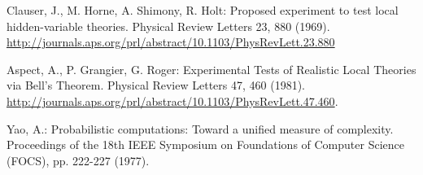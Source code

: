 Clauser, J., M. Horne, A. Shimony, R. Holt: Proposed experiment to test local
hidden-variable theories. Physical Review Letters 23, 880 (1969). \url{http://journals.aps.org/prl/abstract/10.1103/PhysRevLett.23.880}

Aspect, A., P. Grangier, G. Roger: Experimental Tests of Realistic Local Theories via Bell's Theorem. Physical Review Letters 47, 460 (1981). \url{http://journals.aps.org/prl/abstract/10.1103/PhysRevLett.47.460}.

Yao, A.: Probabilistic computations: Toward a unified measure of complexity. Proceedings of the 18th IEEE Symposium on Foundations of Computer Science (FOCS), pp. 222-227 (1977).
